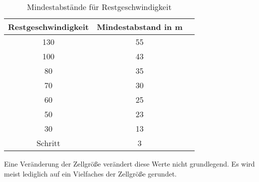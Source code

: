 \begin{table}[ht]
\begin{center}
\setlength{\tabcolsep}{0.5em} %
{\renewcommand{\arraystretch}{1.2}%
\begin{tabular}{| c  c  c |}
\hline 
Restgeschwindigkeit & Mindestabstand in m \\ \hline 
130 & 55 \\ 
100 & 43 \\ 
80 & 35 \\ 
70 & 30 \\ 
60 & 25 \\ 
50 & 23 \\ 
30 & 13 \\ 
Schritt & 3 \\ \hline
\end{tabular}
}
\caption{Mindestabstände für Restgeschwindigkeit}
\label{tab:restgeschw-abstand}
\end{center}
\end{table}

Eine Veränderung der Zellgröße verändert diese Werte nicht grundlegend. 
Es wird meist lediglich auf ein Vielfaches der Zellgröße gerundet.
\\













